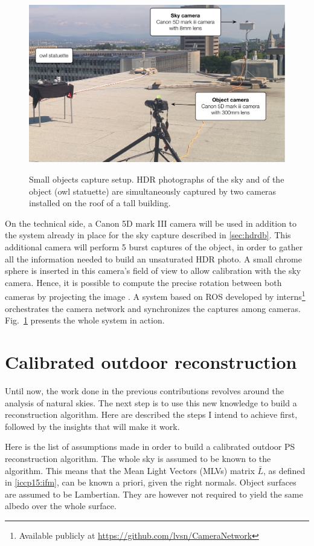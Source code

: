 \begin{figure}
    \centering
    \includegraphics[width=.52\linewidth]{./figures/realData/realData-setup.pdf} \\[1mm]
    \caption{Small objects capture setup. HDR photographs of the sky and of the object (owl statuette) are simultaneously captured by two cameras installed on the roof of a tall building.}
    \label{fig:proposed-real-data-setup}
\end{figure}


On the technical side, a Canon 5D mark III camera will be used in addition to the system already in place for the sky capture described in \ref{sec:hdrdb}. This additional camera will perform 5 burst captures of the object, in order to gather all the information needed to build an unsaturated HDR photo. A small chrome sphere is inserted in this camera's field of view to allow calibration with the sky camera. Hence, it is possible to compute the precise rotation between both cameras by projecting the image . A system based on ROS developed by interns\footnote{Available publicly at \url{https://github.com/lvsn/CameraNetwork}} orchestrates the camera network and synchronizes the captures among cameras. Fig.~\ref{fig:proposed-real-data-setup} presents the whole system in action.


\section{Calibrated outdoor reconstruction}
\label{sec:calib}

Until now, the work done in the previous contributions revolves around the analysis of natural skies. The next step is to use this new knowledge to build a reconstruction algorithm. Here are described the steps I intend to achieve first, followed by the insights that will make it work.

Here is the list of assumptions made in order to build a calibrated outdoor PS reconstruction algorithm. The whole sky is assumed to be known to the algorithm. This means that the Mean Light Vectors (MLVs) matrix $\bar{L}$, as defined in \ref{iccp15:ifm}, can be known a priori, given the right normals. Object surfaces are assumed to be Lambertian. They are however not required to yield the same albedo over the whole surface.

